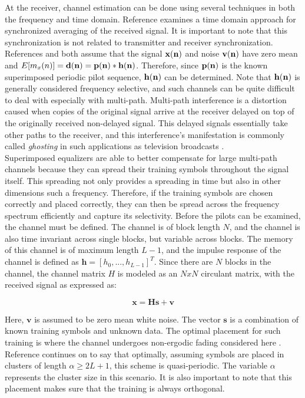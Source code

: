 At the receiver, channel estimation can be done using several techniques in both the frequency and time domain.  Reference \cite{17} examines a time domain approach for synchronized averaging of the received signal.  It is important to note that this synchronization is not related to transmitter and receiver synchronization.  References \cite{17} and \cite{18} both assume that the signal \( \bf{x}(n)\) and noise \( \bf{v}(n) \) have zero mean and \(E[m_{x}(n)] = \bf{d}(n) = \bf{p}(n) \ast \bf{h}(n)\).  Therefore, since \(\bf{p}(n) \) is the known superimposed periodic pilot sequence, \(\bf{h}(n)\) can be determined.  Note that \(\bf{h}(n)\) is generally considered frequency selective, and such channels can be quite difficult to deal with especially with multi-path.  Multi-path interference is a distortion caused when copies of the original signal arrive at the receiver delayed on top of the originally received non-delayed signal.  This delayed signals essentially take other paths to the receiver, and this interference's manifestation is commonly called \textit{ghosting} in such applications as television broadcasts \cite{ghost}.\\

Superimposed equalizers are able to better compensate for large multi-path channels because they can spread their training symbols throughout the signal itself.  This spreading not only provides a spreading in time but also in other dimensions such a frequency.  Therefore, if the training symbols are chosen correctly and placed correctly, they can then be spread across the frequency spectrum efficiently and capture its selectivity.  Before the pilots can be examined, the channel must be defined.  The channel is of block length \(N\), and the channel is also time invariant across single blocks, but variable across blocks.  The memory of this channel is of maximum length \(L-1\), and the impulse response of the channel is defined as \(\textbf{h}=[h_{0},...,h_{L-1}]^{T}\).  Since there are \(N\) blocks in the channel, the channel matrix \(H\) is modeled as an \(N x N\) circulant matrix, with the received signal as expressed as:

\begin{equation}
\textbf{x}=\textbf{H}\textbf{s}+\textbf{v}
\end{equation}

Here, \(\textbf{v}\) is assumed to be zero mean white noise.  The vector \(\textbf{s}\) is a combination of known training symbols and unknown data.  The optimal placement for such training is where the channel undergoes non-ergodic fading considered here \cite{20}.  Reference \cite{16} continues on to say that optimally, assuming symbols are placed in clusters of length \(\alpha \ge 2L+1\), this scheme is quasi-periodic.  The variable \(\alpha\) represents the cluster size in this scenario.  It is also important to note that this placement makes sure that the training is always orthogonal.\\

